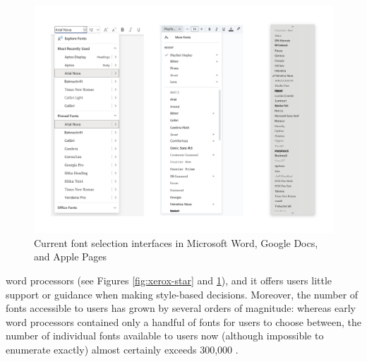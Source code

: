 \begin{figure}[H]
    \centering
    \includegraphics[width=1\textwidth]{images/font-selectors.png}
    \caption{Current font selection interfaces in Microsoft Word, Google Docs, and Apple Pages}
    \label{fig:font-selectors}
\end{figure}

\noindent word processors (see Figures \ref{fig:xerox-star} and \ref{fig:font-selectors}), and it offers users little support or guidance when making style-based decisions. Moreover, the number of fonts accessible to users has grown by several orders of magnitude: whereas early word processors contained only a handful of fonts for users to choose between, the number of individual fonts available to users now (although impossible to enumerate exactly) almost certainly exceeds 300,000 \cite{cheng2006}.

